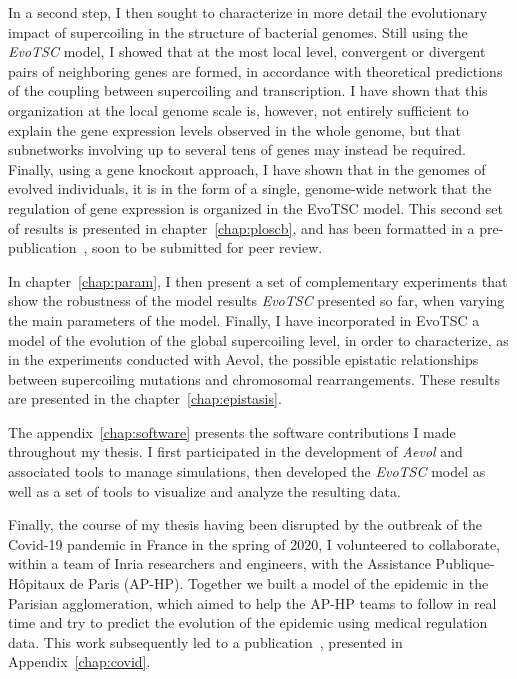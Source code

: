 In a second step, I then sought to characterize in more detail the evolutionary impact of supercoiling in the structure of bacterial genomes.
Still using the \emph{EvoTSC} model, I showed that at the most local level, convergent or divergent pairs of neighboring genes are formed, in accordance with theoretical predictions of the coupling between supercoiling and transcription.
I have shown that this organization at the local genome scale is, however, not entirely sufficient to explain the gene expression levels observed in the whole genome, but that subnetworks involving up to several tens of genes may instead be required.
Finally, using a gene knockout approach, I have shown that in the genomes of evolved individuals, it is in the form of a single, genome-wide network that the regulation of gene expression is organized in the EvoTSC model.
This second set of results is presented in chapter~\ref{chap:ploscb}, and has been formatted in a pre-publication~\citep{grohens2022b}, soon to be submitted for peer review.

In chapter~\ref{chap:param}, I then present a set of complementary experiments that show the robustness of the model results \emph{EvoTSC} presented so far, when varying the main parameters of the model.
Finally, I have incorporated in EvoTSC a model of the evolution of the global supercoiling level, in order to characterize, as in the experiments conducted with Aevol, the possible epistatic relationships between supercoiling mutations and chromosomal rearrangements.
These results are presented in the chapter~\ref{chap:epistasis}.

The appendix~\ref{chap:software} presents the software contributions I made throughout my thesis.
I first participated in the development of \emph{Aevol} and associated tools to manage simulations, then developed the \emph{EvoTSC} model as well as a set of tools to visualize and analyze the resulting data.

Finally, the course of my thesis having been disrupted by the outbreak of the Covid-19 pandemic in France in the spring of 2020, I volunteered to collaborate, within a team of Inria researchers and engineers, with the Assistance Publique-Hôpitaux de Paris (AP-HP).
Together we built a model of the epidemic in the Parisian agglomeration, which aimed to help the AP-HP teams to follow in real time and try to predict the evolution of the epidemic using medical regulation data.
This work subsequently led to a publication~\citep{gaubert2020}, presented in Appendix~\ref{chap:covid}.

